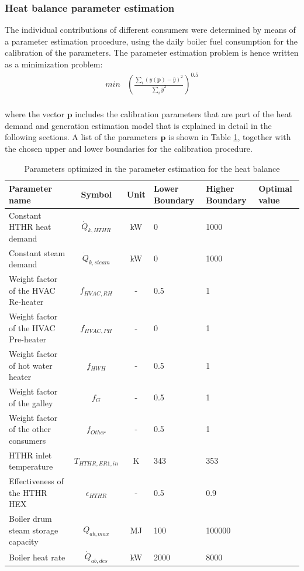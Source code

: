 \documentclass[preprint,12pt]{elsarticle}
\begin{document}
	
\subsubsection{Heat balance parameter estimation}
	
The individual contributions of different consumers were determined by means of a parameter estimation procedure, using the daily boiler fuel consumption for the calibration of the parameters. The parameter estimation problem is hence written as a minimization problem:
\begin{eqnarray}
min &  \left(\frac{\sum_i(y(\textbf{p})-\bar{y})^2}{\sum_i \bar{y}^2}\right)^{0.5} \\
\end{eqnarray}
	
where the vector $\textbf{p}$ includes the calibration parameters that are part of the heat demand and generation estimation model that is explained in detail in the following sections. A list of the parameters $\textbf{p}$ is shown in Table \ref{tab:ParameterEstimation}, together with the chosen upper and lower boundaries for the calibration procedure.
\begin{table}
	\centering
	\begin{tabular}{p{3cm}ccp{1.6cm}p{1.6cm}p{1.2cm}}
		\hline 
		Parameter name & Symbol  & Unit & Lower Boundary & Higher Boundary & Optimal value \\ 
		\hline
		Constant HTHR heat demand	 & $\dot{Q}_{k,HTHR}$ & kW & 0 & 1000 &  \\ 
		Constant steam demand		 & $\dot{Q}_{k,steam}$ & kW & 0 & 1000 &  \\
		Weight factor of the HVAC Re-heater & $f_{HVAC,RH}$ & - & 0.5 & 1 &  \\ 
		Weight factor of the HVAC Pre-heater & $f_{HVAC,PH}$ & - & 0 & 1 &  \\ 
		Weight factor of hot water heater & $f_{HWH}$ & - & 0.5 & 1 &  \\ 
		Weight factor of the galley & $f_{G}$ & - & 0.5 & 1 &  \\ 
		Weight factor of the other consumers & $f_{Other}$ & - & 0.5 & 1 &  \\ 
		HTHR inlet temperature & $T_{HTHR,ER1,in}$ & K & 343 & 353 &  \\
		Effectiveness of the HTHR HEX & $\epsilon_{HTHR} $ & - & 0.5 & 0.9 &  \\
		Boiler drum steam storage capacity & $Q_{ab,max}$ & MJ & 100 & 100000 &  \\ 
		Boiler heat rate & $\dot{Q}_{ab,des}$ & kW & 2000 & 8000 &  \\ 
		\hline
	\end{tabular}
	\caption{Parameters optimized in the parameter estimation for the heat balance}
	\label{tab:ParameterEstimation} 
\end{table}
	
\end{document}
